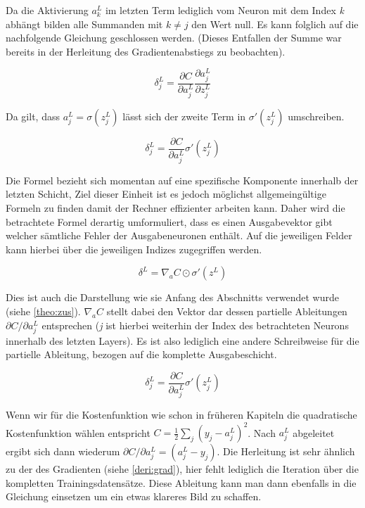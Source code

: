 Da die Aktivierung $a^L_k$ im letzten Term lediglich vom Neuron mit dem Index \emph{k} abhängt bilden alle Summanden mit $k \neq j$ den Wert null. Es kann folglich auf die nachfolgende Gleichung geschlossen werden. (Dieses Entfallen der Summe war bereits in der Herleitung des Gradientenabstiegs zu beobachten). 

\begin{equation}
\delta^L_j = \frac{\partial C}{\partial a^L_j} \frac{\partial a^L_j}{\partial z^L_j}
\end{equation}

Da gilt, dass $a^L_j = \sigma(z^L_j)$ lässt sich der zweite Term in $\sigma'(z^L_j)$ umschreiben. 

\begin{equation}
\delta^L_j = \frac{\partial C}{\partial a^L_j} \sigma'(z^L_j)
\end{equation}

Die Formel bezieht sich momentan auf eine spezifische Komponente innerhalb der letzten Schicht, Ziel dieser Einheit ist es jedoch möglichst allgemeingültige Formeln zu finden damit der Rechner effizienter arbeiten kann. Daher wird die betrachtete Formel derartig umformuliert, dass es einen Ausgabevektor gibt welcher sämtliche Fehler der Ausgabeneuronen enthält. Auf die jeweiligen Felder kann hierbei über die jeweiligen Indizes zugegriffen werden. 

\begin{equation}
\delta^L = \nabla_a C \odot \sigma'(z^L)
\end{equation}

Dies ist auch die Darstellung wie sie Anfang des Abschnitts verwendet wurde (siehe \ref{theo:zus}). $\nabla_a C$ stellt dabei den Vektor dar dessen partielle Ableitungen $\partial C / \partial a^L_j$ entsprechen (\emph{j} ist hierbei weiterhin der Index des betrachteten Neurons innerhalb des letzten Layers). Es ist also lediglich eine andere Schreibweise für die partielle Ableitung, bezogen auf die komplette Ausgabeschicht. 

\begin{equation}
\delta^L_j = \frac{\partial C}{\partial a^L_j} \sigma'(z^L_j)
\end{equation}


Wenn wir für die Kostenfunktion wie schon in früheren Kapiteln die quadratische Kostenfunktion wählen entspricht $C = \frac{1}{2} \sum_j (y_j-a^L_j)^2$. Nach $a^L_j$ abgeleitet ergibt sich dann wiederum $\partial C / \partial a^L_j = (a_j^L-y_j)$. Die Herleitung ist sehr ähnlich zu der des Gradienten (siehe \ref{deri:grad}), hier fehlt lediglich die Iteration über die kompletten Trainingsdatensätze. Diese Ableitung kann man dann ebenfalls in die Gleichung einsetzen um ein etwas klareres Bild zu schaffen. 

